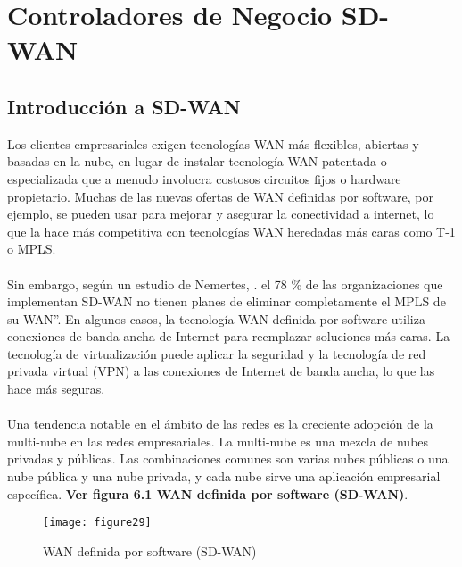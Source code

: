 \chapter{Controladores de Negocio SD-WAN}
\label{cha:Controladores de Negocio SD-WAN}


\section{Introducción a SD-WAN}
\label{sec:Introducción a SD-WAN}

Los clientes empresariales exigen tecnologías WAN más flexibles, abiertas y basadas en la nube, en lugar de instalar tecnología WAN patentada o especializada que a menudo involucra costosos circuitos fijos o hardware propietario. Muchas de las nuevas ofertas de WAN definidas por software, por ejemplo, se pueden usar para mejorar y asegurar la conectividad a internet, lo que la hace más competitiva
con tecnologías WAN heredadas más caras como T-1 o MPLS.
\\
\\
Sin embargo, según un estudio de Nemertes, . el 78 \% de las organizaciones que implementan SD-WAN no tienen planes de eliminar completamente el MPLS de su WAN”. En algunos casos, la tecnología WAN definida por software utiliza conexiones de banda ancha de Internet para reemplazar soluciones más caras. La tecnología de virtualización puede aplicar la seguridad y la tecnología de red privada virtual (VPN) a las conexiones
de Internet de banda ancha, lo que las hace más seguras.
\\
\\
Una tendencia notable en el ámbito de las redes es la creciente adopción de la multi-nube en las redes empresariales. La multi-nube es una mezcla de nubes privadas y públicas. Las combinaciones comunes son varias nubes públicas o una nube pública y una nube privada, y cada nube sirve una aplicación empresarial específica.
\textbf{Ver figura 6.1 WAN definida por software (SD-WAN)}.


\begin{figure}[htbp]
  \centering
    {\texttt{[image: figure29]}}%
  \caption{WAN definida por software (SD-WAN)}
  \label{fig:fig2subfig}
\end{figure}

